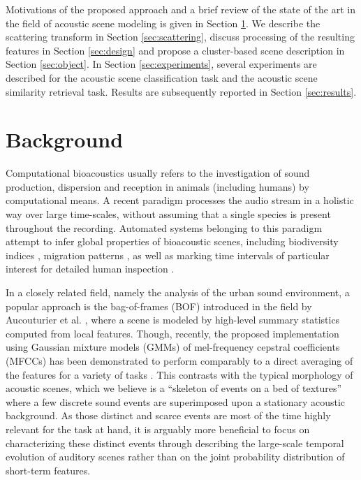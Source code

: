 \documentclass[journal]{IEEEtran}
\makeatletter
\newcommand*{\ie}{i.e.\@\xspace}
\makeatother
\begin{document}
Motivations of the proposed approach and a brief review of the state of the art in the field of acoustic scene modeling is given in Section \ref{sec:soa}. We describe the scattering transform in Section \ref{sec:scattering}, discuss processing of the resulting features in Section \ref{sec:design} and propose a cluster-based scene description in Section \ref{sec:object}. In Section \ref{sec:experiments}, several experiments are described for the acoustic scene classification task and the acoustic scene similarity retrieval task. Results are subsequently reported in Section \ref{sec:results}.

\section{Background} \label{sec:soa}


Computational bioacoustics usually refers to the investigation of sound production, dispersion and reception in animals (including humans) by computational means. A recent paradigm  processes the audio stream in a holistic way over large time-scales, without assuming that a single species is present throughout the recording. Automated systems belonging to this paradigm attempt to infer global properties of bioacoustic scenes, including biodiversity indices \cite{Bardeli2010}, migration patterns \cite{Obrist2010}, as well as marking time intervals of particular interest for detailed human inspection \cite{rosenstock2002landbird}.

In a closely related field, namely the analysis of the urban sound environment, a popular approach is the bag-of-frames (BOF) introduced in the field by Aucouturier et al. \cite{aucouturier2007bag}, where a scene is modeled by high-level summary statistics computed from local features.
Though, recently, the proposed implementation using Gaussian mixture models (GMMs) of mel-frequency cepstral coefficients (MFCCs) has been demonstrated to perform comparably to a direct averaging of the features for a variety of tasks \cite{lagrange:hal-01082501}.
This contrasts with the typical morphology of acoustic scenes, which we believe is a ``skeleton of events on a bed of textures'' \cite{nelken2013} where a few discrete sound events are superimposed upon a stationary acoustic background.
As those distinct and scarce events are most of the time highly relevant for the task at hand, it is arguably more beneficial to focus on characterizing these distinct events through describing the large-scale temporal evolution of auditory scenes rather than on the joint probability distribution of short-term features.
\end{document}
